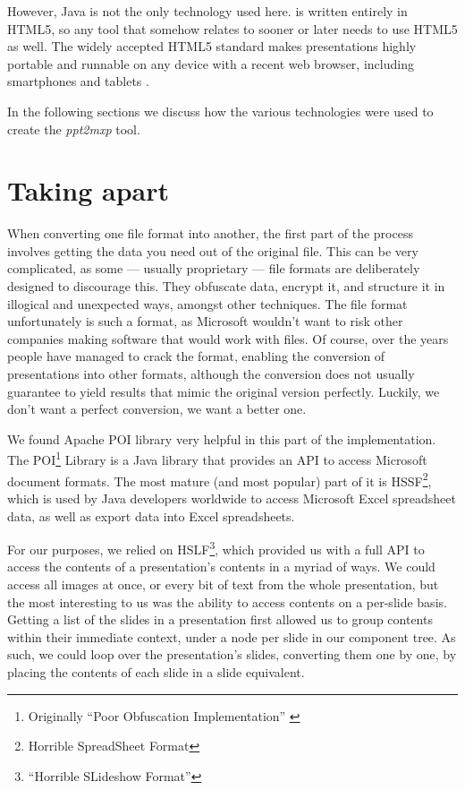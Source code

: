   However, Java is not the only technology used here. \mxp is written entirely
  in HTML5, so any tool that somehow relates to \mxp sooner or later needs to
  use HTML5 as well. The widely accepted HTML5 standard makes \mxp
  presentations highly portable and runnable on any device with a recent web
  browser, including smartphones and tablets \citep{roels-1}.

  In the following sections we discuss how the various technologies were used
  to create the \emph{ppt2mxp} tool.

  \section{Taking \ppt apart}
   \label{poi}

   When converting one file format into another, the first part of the process
   involves getting the data you need out of the original file. This can be
   very complicated, as some --- usually proprietary --- file formats are
   deliberately designed to discourage this. They obfuscate data, encrypt it,
   and structure it in illogical and unexpected ways, amongst other techniques.
   The \ppt file format unfortunately is such a format, as Microsoft wouldn't
   want to risk other companies making software that would work with \ppt
   files. Of course, over the years people have managed to crack the format,
   enabling the conversion of \ppt presentations into other formats, although
   the conversion does not usually guarantee to yield results that mimic the
   original version perfectly. Luckily, we don't want a perfect conversion, we
   want a better one.

   We found Apache POI library very helpful in this part of the implementation.
   The POI\footnote{Originally ``Poor Obfuscation Implementation''
   \citep{sundaram-1}} Library is a Java library that provides an API to access
   Microsoft document formats. The most mature (and most popular) part of it is
   HSSF\footnote{Horrible SpreadSheet Format}, which is used by Java developers
   worldwide to access Microsoft Excel spreadsheet data, as well as export data
   into Excel spreadsheets.

   For our purposes, we relied on HSLF\footnote{``Horrible SLideshow Format''},
   which provided us with a full API to access the contents of a \ppt
   presentation's contents in a myriad of ways. We could access all images at
   once, or every bit of text from the whole presentation, but the most
   interesting to us was the ability to access contents on a per-slide basis.
   Getting a list of the slides in a presentation first allowed us to group
   contents within their immediate context, under a node per slide in our
   component tree. As such, we could loop over the presentation's slides,
   converting them one by one, by placing the contents of each slide in a \mxp
   slide equivalent.


